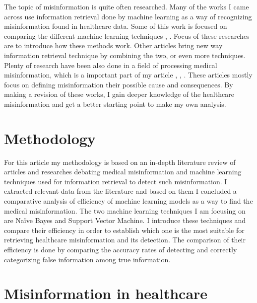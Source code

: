 \documentclass[11pt ,english,a4paper]{article}
\begin{document}
The topic of misinformation is quite often researched. Many of the works I came across use information retrieval done by machine learning as a way of recognizing misinformation found in healthcare data. Some of this work is focused on comparing the different machine learning techniques \cite{sha20mach}, \cite{pod19mach}. Focus of these researches are to introduce how these methods work. Other articles bring new way information retrieval technique \cite{chap22unmask} by combining the two, or even more techniques. Plenty of research have been also done in a field of processing medical misinformation, which is a important part of my article \cite{gu20misinfo}, \cite{cook15misinfo}, \cite{wa19sys}. These articles mostly focus on defining misinformation their possible cause and consequences. By making a revision of these works, I gain deeper knowledge of the healthcare misinformation and get a better starting point to make my own analysis.

\section{Methodology}\label{methodology}

For this article my methodology is based on an in-depth literature review of articles and researches debating medical misinformation and machine learning techniques used for information retrieval to detect such misinformation. I extracted relevant data from the literature and based on them I concluded a comparative analysis of efficiency of machine learning models as a way to find the medical misinformation. The two machine learning techniques I am focusing on are Naïve Bayes and Support Vector Machine. I introduce these techniques and compare their efficiency in order to establish which one is the most suitable for retrieving healthcare misinformation and its detection. The comparison of their efficiency is done by comparing the accuracy rates of detecting and correctly categorizing false information among true information. 

\section{Misinformation in healthcare}\label{mih}
\end{document}
